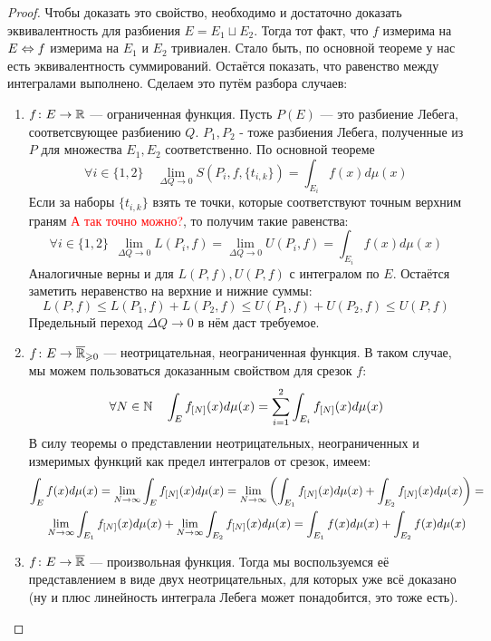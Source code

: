 \begin{proof}
	Чтобы доказать это свойство, необходимо и достаточно доказать эквивалентность для разбиения $E = E_1 \sqcup E_2$. Тогда тот факт, что $f$ измерима на $E \Leftrightarrow f$ измерима на $E_1$ и $E_2$ тривиален. Стало быть, по основной теореме у нас есть эквивалентность суммирований. Остаётся показать, что равенство между интегралами выполнено. Сделаем это путём разбора случаев:
	\begin{enumerate}
		\item $f \colon E \to \mathbb{R}$ --- ограниченная функция. Пусть $P(E)$ --- это разбиение Лебега, соответсвующее разбиению $Q$. $P_1, P_2$ - тоже разбиения Лебега, полученные из $P$ для множества $E_1, E_2$ соответственно. По основной теореме
		\[
			\forall i \in \{1, 2\} \quad \lim_{\Delta Q \to 0} S(P_i, f, \{t_{i, k}\}) = \int_{E_i} f(x)d\mu(x)
		\]
		Если за наборы $\{t_{i, k}\}$ взять те точки, которые соответствуют точным верхним граням \textcolor{red}{А так точно можно?}, то получим такие равенства:
		\[
			\forall i \in \{1, 2\}\ \ \lim_{\Delta Q \to 0} L(P_i, f) = \lim_{\Delta Q \to 0} U(P_i, f) = \int_{E_i} f(x)d\mu(x)
		\]
		Аналогичные верны и для $L(P, f), U(P, f)$ с интегралом по $E$. Остаётся заметить неравенство на верхние и нижние суммы:
		\[
			L(P, f) \le L(P_1, f) + L(P_2, f) \le U(P_1, f) + U(P_2, f) \le U(P, f)
		\]
		Предельный переход $\Delta Q \to 0$ в нём даст требуемое.
		
		\item $f \colon E \to \overline{\mathbb{R}}_{\geqslant 0}$ --- неотрицательная, неограниченная функция. В таком случае, мы можем пользоваться доказанным свойством для срезок $f$:
		\[
			\forall N \in \mathbb{N} \quad \int_E f_{[N]}(x)d\mu(x) = \sum_{i = 1}^2 \int_{E_i} f_{[N]}(x)d\mu(x)
		\]
		В силу теоремы о представлении неотрицательных, неограниченных и измеримых функций как предел интегралов от срезок, имеем:
		\begin{multline*}
			\int_E f(x)d\mu(x) = \lim_{N \to \infty} \int_E f_{[N]}(x)d\mu(x) = \lim_{N \to \infty} \left(\int_{E_1} f_{[N]}(x)d\mu(x) + \int_{E_2} f_{[N]}(x)d\mu(x)\right) =
			\\
			\lim_{N \to \infty} \int_{E_1} f_{[N]}(x)d\mu(x) + \lim_{N \to \infty} \int_{E_2} f_{[N]}(x)d\mu(x) = \int_{E_1} f(x)d\mu(x) + \int_{E_2} f(x)d\mu(x)
		\end{multline*}
		
		\item $f \colon E \to \overline{\mathbb{R}}$ --- произвольная функция. Тогда мы воспользуемся её представлением в виде двух неотрицательных, для которых уже всё доказано (ну и плюс линейность интеграла Лебега может понадобится, это тоже есть).
	\end{enumerate}
\end{proof}


